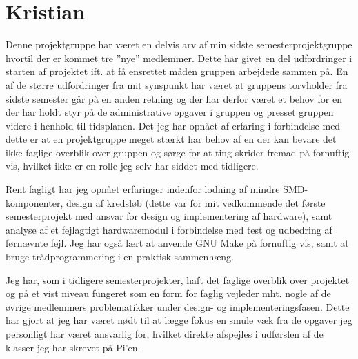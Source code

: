 \section{Kristian}

Denne projektgruppe har været en delvis arv af min sidste semesterprojektgruppe hvortil der er kommet tre ''nye'' medlemmer.
Dette har givet en del udfordringer i starten af projektet ift. at få ensrettet måden gruppen arbejdede sammen på.
En af de større udfordringer fra mit synspunkt har været at gruppens torvholder fra sidste semester går på en anden retning og der har derfor været et behov for en der har holdt styr på de administrative opgaver i gruppen og presset gruppen videre i henhold til tidsplanen. 
Det jeg har opnået af erfaring i forbindelse med dette er at en projektgruppe meget stærkt har behov af en der kan bevare det ikke-faglige overblik over gruppen og sørge for at ting skrider fremad på fornuftig vis, hvilket ikke er en rolle jeg selv har siddet med tidligere.

Rent fagligt har jeg opnået erfaringer indenfor lodning af mindre SMD-komponenter, design af kredsløb (dette var for mit vedkommende det første semesterprojekt med ansvar for design og implementering af hardware), samt analyse af et fejlagtigt hardwaremodul i forbindelse med test og udbedring af førnævnte fejl.
Jeg har også lært at anvende GNU Make på fornuftig vis, samt at bruge trådprogrammering i en praktisk sammenhæng.

Jeg har, som i tidligere semesterprojekter, haft det faglige overblik over projektet og på et vist niveau fungeret som en form for faglig vejleder mht. nogle af de øvrige medlemmers problematikker under design- og implementeringsfasen. 
Dette har gjort at jeg har været nødt til at lægge fokus en smule væk fra de opgaver jeg personligt har været ansvarlig for, hvilket direkte afspejles i udførslen af de klasser jeg har skrevet på Pi'en.